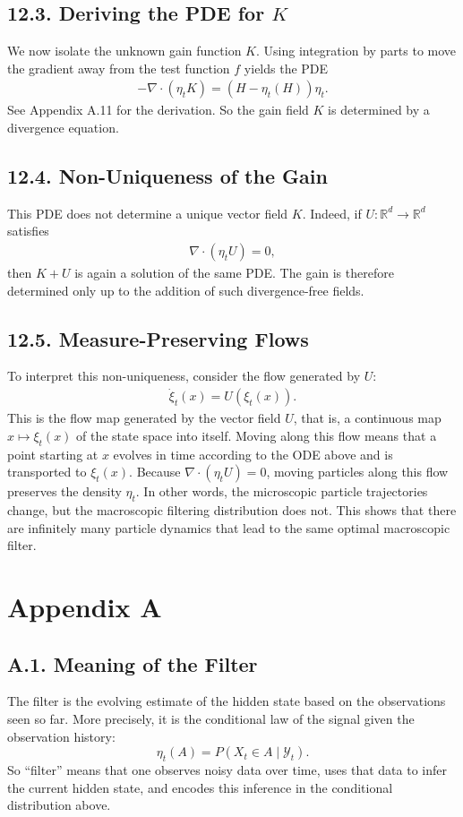 \documentclass[11pt]{article}
\theoremstyle{definition}
\theoremstyle{remark}
\begin{document}
\subsection*{12.3. Deriving the PDE for $K$}
We now isolate the unknown gain function $K$. Using integration by parts to move the gradient away from the test function $f$ yields the PDE
\begin{align*}
-\nabla\cdot(\eta_t K)=(H-\eta_t(H))\eta_t.
\end{align*}
See Appendix A.11 for the derivation. So the gain field $K$ is determined by a divergence equation.

\subsection*{12.4. Non-Uniqueness of the Gain}
This PDE does not determine a unique vector field $K$. Indeed, if $U:\mathbb R^d\to\mathbb R^d$ satisfies
\begin{align*}
\nabla\cdot(\eta_t U)=0,
\end{align*}
then $K+U$ is again a solution of the same PDE. The gain is therefore determined only up to the addition of such divergence-free fields.

\subsection*{12.5. Measure-Preserving Flows}
To interpret this non-uniqueness, consider the flow generated by $U$:
\begin{align*}
\dot \xi_t(x)=U(\xi_t(x)).
\end{align*}
This is the flow map generated by the vector field $U$, that is, a continuous map $x\mapsto \xi_t(x)$ of the state space into itself. Moving along this flow means that a point starting at $x$ evolves in time according to the ODE above and is transported to $\xi_t(x)$. Because $\nabla\cdot(\eta_t U)=0$, moving particles along this flow preserves the density $\eta_t$. In other words, the microscopic particle trajectories change, but the macroscopic filtering distribution does not. This shows that there are infinitely many particle dynamics that lead to the same optimal macroscopic filter.

\appendix
\section*{Appendix A}

\subsection*{A.1. Meaning of the Filter}
The filter is the evolving estimate of the hidden state based on the observations seen so far. More precisely, it is the conditional law of the signal given the observation history:
\[
\eta_t(A)=P(X_t\in A\mid \mathcal Y_t).
\]
So ``filter'' means that one observes noisy data over time, uses that data to infer the current hidden state, and encodes this inference in the conditional distribution above.
\end{document}
